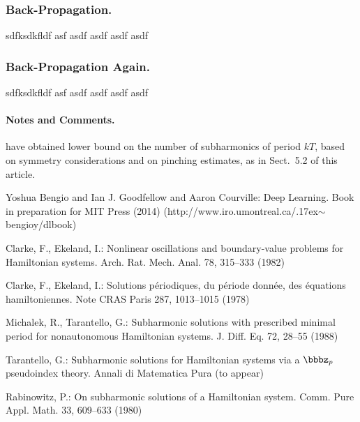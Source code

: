 \documentclass{llncs}
\begin{document}
\subsubsection*{Back-Propagation.}
sdfksdkfldf asf asdf asdf asdf asdf 

\subsubsection*{Back-Propagation Again.}
sdfksdkfldf asf asdf asdf asdf asdf 

\paragraph{Notes and Comments.}

have obtained lower bound on the number of subharmonics of period $kT$,
based on symmetry considerations and on pinching estimates, as in
Sect.~5.2 of this article.


%
%
\begin{thebibliography}{5}
%


Yoshua Bengio and Ian J. Goodfellow and Aaron Courville:
Deep Learning.
Book in preparation for MIT Press (2014)
\newcommand{\mytilde}{\raise.17ex\hbox{$\scriptstyle\mathtt{\sim}$}}
(http://www.iro.umontreal.ca/\mytilde{}bengioy/dlbook)


Clarke, F., Ekeland, I.:
Nonlinear oscillations and
boundary-value problems for Hamiltonian systems.
Arch. Rat. Mech. Anal. 78, 315--333 (1982)

Clarke, F., Ekeland, I.:
Solutions p\'{e}riodiques, du
p\'{e}riode donn\'{e}e, des \'{e}quations hamiltoniennes.
Note CRAS Paris 287, 1013--1015 (1978)

Michalek, R., Tarantello, G.:
Subharmonic solutions with prescribed minimal
period for nonautonomous Hamiltonian systems.
J. Diff. Eq. 72, 28--55 (1988)

Tarantello, G.:
Subharmonic solutions for Hamiltonian
systems via a $\bbbz_{p}$ pseudoindex theory.
Annali di Matematica Pura (to appear)

Rabinowitz, P.:
On subharmonic solutions of a Hamiltonian system.
Comm. Pure Appl. Math. 33, 609--633 (1980)

\end{thebibliography}
\end{document}

